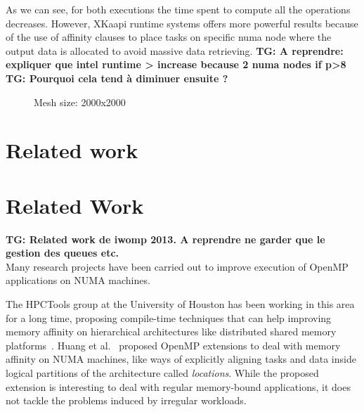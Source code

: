 \documentclass{Styles/llncs}
\newcommand{\TG}[1]{{\color{red}\bfseries TG: #1}}
\begin{document}
As we can see, for both executions the time spent to compute all the operations decreases. However, XKaapi runtime systems offers more powerful results because of the use of affinity clauses to place tasks on specific numa node where the output data is allocated to avoid massive data retrieving.
\TG{A reprendre: expliquer que intel runtime > increase because 2 numa nodes if p>8}
\TG{Pourquoi cela tend à diminuer ensuite ?}

\begin{figure}
  \centering
    \caption{Mesh size: 2000x2000}
    \label{figs:spmv:2000}
\end{figure}



\section{Related work}

\section{Related Work}
\label{sec:related_work}

\TG{Related work de iwomp 2013. A reprendre ne garder que le gestion des queues etc.}\\

Many research projects have been carried out to improve execution of
OpenMP applications on NUMA machines.

The HPCTools group at the University of Houston has been working in
this area for a long time, proposing compile-time techniques that can
help improving memory affinity on hierarchical architectures like
distributed shared memory
platforms~\cite{Marowka:2004:OAD:1064428.1064431}. Huang et
al.~\cite{Huang-Chapman-locality-OpenMP} proposed OpenMP extensions to
deal with memory affinity on NUMA machines, like ways of explicitly
aligning tasks and data inside logical partitions of the architecture
called \textit{locations}. While the proposed extension is interesting
to deal with regular memory-bound applications, it does not tackle
the problems induced by irregular workloads.
\end{document}
